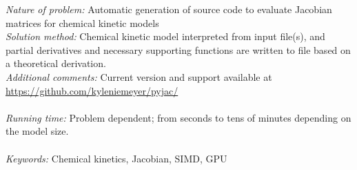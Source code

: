 \documentclass[preprint,12pt]{elsarticle}
\begin{document}
\begin{small}
{\em Nature of problem:} Automatic generation of source code to evaluate Jacobian matrices for chemical kinetic models \\
{\em Solution method:} Chemical kinetic model interpreted from input file(s), and partial derivatives and necessary supporting functions are written to file based on a theoretical derivation.\\
{\em Additional comments:} Current version and support available at \url{https://github.com/kyleniemeyer/pyjac/}\\
   \\
{\em Running time:} Problem dependent; from seconds to tens of minutes depending on the model size. \\
 \\ 
{\em Keywords:} Chemical kinetics, Jacobian, SIMD, GPU 
  
\end{small}

\listoftodos{}
\end{document}
